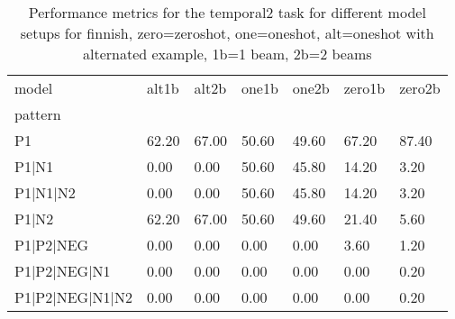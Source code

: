 \begin{table}[h]
\begin{tabular}{l|llllll}
\toprule
model & alt1b & alt2b & one1b & one2b & zero1b & zero2b \\
pattern &  &  &  &  &  &  \\
\midrule
P1 & 62.20 & 67.00 & 50.60 & 49.60 & 67.20 & 87.40 \\
P1|N1 & 0.00 & 0.00 & 50.60 & 45.80 & 14.20 & 3.20 \\
P1|N1|N2 & 0.00 & 0.00 & 50.60 & 45.80 & 14.20 & 3.20 \\
P1|N2 & 62.20 & 67.00 & 50.60 & 49.60 & 21.40 & 5.60 \\
P1|P2|NEG & 0.00 & 0.00 & 0.00 & 0.00 & 3.60 & 1.20 \\
P1|P2|NEG|N1 & 0.00 & 0.00 & 0.00 & 0.00 & 0.00 & 0.20 \\
P1|P2|NEG|N1|N2 & 0.00 & 0.00 & 0.00 & 0.00 & 0.00 & 0.20 \\
\bottomrule
\end{tabular}
\caption{Performance metrics for the temporal2 task for different model setups for finnish, zero=zeroshot, one=oneshot, alt=oneshot with alternated example, 1b=1 beam, 2b=2 beams}
\label{tab:fi_temporal2_performance}
\end{table}
